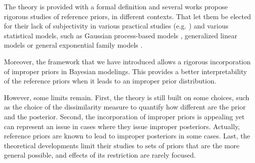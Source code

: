The theory is provided with a formal definition and
several works propose rigorous studies of reference priors, in different contexts.
That let them be elected for their lack of subjectivity in various practical studies (e.g. \cite{chen_properties_2008,gu_parallel_2016,dandrea_objective_2021})
and various statistical models, such as Gaussian process-based models \citep{paulo_default_2005,gu_parallel_2016}, generalized linear models \citep{natarajan_reference_2000} or general exponential family models \citep{clarke_reference_2010}.

Moreover, the framework that we have introduced allows a rigorous incorporation of improper priors in Bayesian modelings.
This provides a better interpretability of the reference priors when it leads to an improper prior distribution. 











However, some limits remain. 
First, the theory is still built on some choices, such as the choice of the dissimilarity measure to quantify how different are the prior and the posterior.
Second, the incorporation of improper priors is appealing yet can represent an issue in cases where they issue improper posteriors. Actually, reference priors are known to lead to improper posteriors in some cases.
Last, the theoretical developments limit their studies to sets of priors that are the more general possible, and effects of its restriction are rarely focused.












